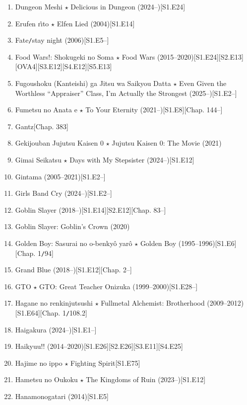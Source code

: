 \documentclass{article}
\begin{document}
\begin{enumerate}
    \item {\sc Dungeon Meshi $\star$ Delicious in Dungeon} (2024--)\hfill[S1.E24]
    \item {\sc Erufen r\^{\i}to $\star$ Elfen Lied} (2004)\hfill[S1.E14]
    \item Fate{\tt/}stay night (2006)\hfill[S1.E5--]
    \item {\sc Food Wars!: Shokugeki no Soma $\star$ Food Wars} (2015--2020)\hfill[S1.E24][S2.E13][OVA4][S3.E12][S4.E12][S5.E13]
    \item Fugoushoku (Kanteishi) ga Jitsu wa Saikyou Datta $\star$ Even Given the Worthless ``Appraiser'' Class, I'm Actually the Strongest (2025--)\hfill[S1.E2--]
    \item Fumetsu no Anata e $\star$ To Your Eternity (2021--)\hfill[S1.E8][Chap. 144--]
    \item {\sc Gantz}\hfill[Chap. 383]
    \item {\sc Gekijouban Jujutsu Kaisen 0 $\star$ Jujutsu Kaisen 0: The Movie} (2021)
    \item {\sc Gimai Seikatsu $\star$ Days with My Stepsister} (2024--)\hfill[S1.E12]
    \item Gintama (2005--2021)\hfill[S1.E2--]
    \item Girls Band Cry (2024--)\hfill[S1.E2--]
    \item {\sc Goblin Slayer} (2018--)\hfill[S1.E14][S2.E12][Chap. 83--]
    \item {\sc Goblin Slayer: Goblin's Crown} (2020)
    \item {\sc Golden Boy: Sasurai no o-benky\^o yar\^o $\star$ Golden Boy} (1995--1996)\hfill[S1.E6][Chap. 1{\tt/}94]
    \item Grand Blue (2018--)\hfill[S1.E12][Chap. 2--]
    \item GTO $\star$ GTO: Great Teacher Onizuka (1999--2000)\hfill[S1.E28--]
    \item {\sc Hagane no renkinjutsushi $\star$ Fullmetal Alchemist: Brotherhood} (2009--2012)\hfill[S1.E64][Chap. 1{\tt/}108.2]
    \item Haigakura (2024--)\hfill[S1.E1--]
    \item {\sc Haikyuu!!} (2014--2020)\hfill[S1.E26][S2.E26][S3.E11][S4.E25]
    \item {\sc Hajime no ippo $\star$ Fighting Spirit}\hfill[S1.E75]
    \item {\sc Hametsu no Oukoku $\star$ The Kingdoms of Ruin} (2023--)\hfill[S1.E12]
    \item {\sc Hanamonogatari} (2014)\hfill[S1.E5]

\end{enumerate}
\end{document}
